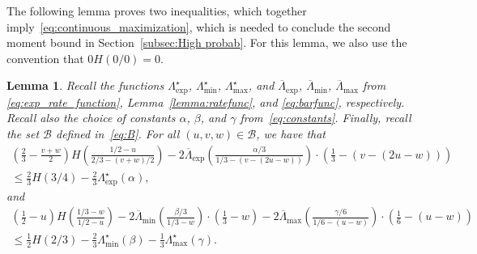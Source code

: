\documentclass[11pt]{article}
\numberwithin{equation}{section}
\def\cB{{\mathcal B}}
\newtheorem{lemma}[theorem]{Lemma}
\theoremstyle{definition}
\begin{document}
The following lemma proves two inequalities, which together imply~\eqref{eq:continuous_maximization}, which is needed to conclude the second moment bound in Section~\ref{subsec:High probab}. For this lemma, we also use the convention that $0H(0/0) = 0$.

\begin{lemma}\label{lem:inequalities_new}
    Recall the functions  $\Lambda_{\exp}^{\star}$, $\Lambda_{\min}^{\star}$, $\Lambda_{\max}^{\star}$, and $\overline \Lambda_{\mathrm{exp}}$, $\overline \Lambda_{\min}$, $\overline \Lambda_{\max}$ from \eqref{eq:exp_rate_function}, Lemma~\ref{lemma:ratefunc}, and \eqref{eq:barfunc}, respectively. 
    Recall also the choice of constants $\alpha$, $\beta$, and $\gamma$ from~\eqref{eq:constants}. 
    Finally, recall the set $\cB$ defined in~\eqref{eq:B}. 
    For all $(u,v,w) \in \cB$, we have that
    \begin{multline}\label{eq:inequalities_new 1}
         \left( \frac{2}{3} - \frac{v+w}{2} \right) H\left(\frac{1/2 - u}{2/3 - (v+w)/2}\right)  -  2 \overline{\Lambda}_{\exp} \left(\frac{\alpha /3 }{1/3 - (v - (2u - w))} \right) \cdot \left( \frac{1}{3} - (v - (2u - w)) \right)\\
         \leq \frac{2}{3}H(3/4) - \frac{2}{3} \Lambda_{\exp}^{\star} (\alpha),
    \end{multline}
    and
    \begin{multline}\label{eq:inequalities_new 2}
         \left( \frac{1}{2} - u \right) H\left(\frac{1/3 - w}{1/2 - u}\right) - 2\overline{\Lambda}_{\min} \left(  \frac{\beta/3}{1/3 - w} \right) \cdot \left( \frac{1}{3} - w \right)
     - 2\overline{\Lambda}_{\max} \left(\frac{\gamma /6}{1/6 - (u-w)} \right) \cdot \left( \frac{1}{6} - (u-w) \right)\\
         \leq \frac{1}{2}H(2/3) - \frac{2}{3} \Lambda_{\min}^{\star} (\beta)-\frac{1}{3} \Lambda_{\max}^{\star} (\gamma).
    \end{multline}
\end{lemma}
\end{document}
